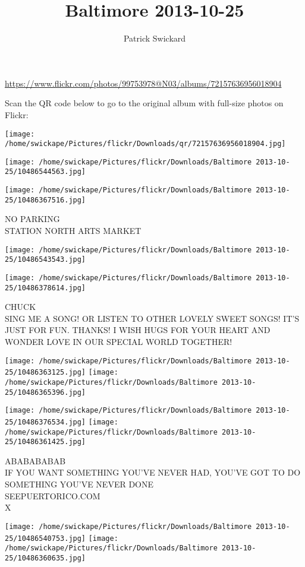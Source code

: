 \documentclass[10pt,letterpaper]{article}
\title{Baltimore 2013-10-25}
\author{Patrick Swickard}
\date{}
\begin{document}
\maketitle

\url{https://www.flickr.com/photos/99753978@N03/albums/72157636956018904}

Scan the QR code below to go to the original album with full-size photos on Flickr:

\texttt{[image: /home/swickape/Pictures/flickr/Downloads/qr/72157636956018904.jpg]}
\pagebreak

\texttt{[image: /home/swickape/Pictures/flickr/Downloads/Baltimore 2013-10-25/10486544563.jpg]}

\vspace{0.25in}
\texttt{[image: /home/swickape/Pictures/flickr/Downloads/Baltimore 2013-10-25/10486367516.jpg]}

NO PARKING\\
STATION NORTH ARTS MARKET
\pagebreak

\texttt{[image: /home/swickape/Pictures/flickr/Downloads/Baltimore 2013-10-25/10486543543.jpg]}

\vspace{0.25in}
\texttt{[image: /home/swickape/Pictures/flickr/Downloads/Baltimore 2013-10-25/10486378614.jpg]}

CHUCK\\
SING ME A SONG!  OR LISTEN TO OTHER LOVELY SWEET SONGS! IT'S JUST FOR FUN. THANKS! I WISH HUGS FOR YOUR HEART AND WONDER LOVE IN OUR SPECIAL WORLD TOGETHER!
\pagebreak

\texttt{[image: /home/swickape/Pictures/flickr/Downloads/Baltimore 2013-10-25/10486363125.jpg]}
\texttt{[image: /home/swickape/Pictures/flickr/Downloads/Baltimore 2013-10-25/10486365396.jpg]}

\texttt{[image: /home/swickape/Pictures/flickr/Downloads/Baltimore 2013-10-25/10486376534.jpg]}
\texttt{[image: /home/swickape/Pictures/flickr/Downloads/Baltimore 2013-10-25/10486361425.jpg]}

ABABABABAB\\
IF YOU WANT SOMETHING YOU'VE NEVER HAD, YOU'VE GOT TO DO SOMETHING YOU'VE NEVER DONE\\
SEEPUERTORICO.COM\\
X
\pagebreak

\texttt{[image: /home/swickape/Pictures/flickr/Downloads/Baltimore 2013-10-25/10486540753.jpg]}
\texttt{[image: /home/swickape/Pictures/flickr/Downloads/Baltimore 2013-10-25/10486360635.jpg]}
\end{document}

